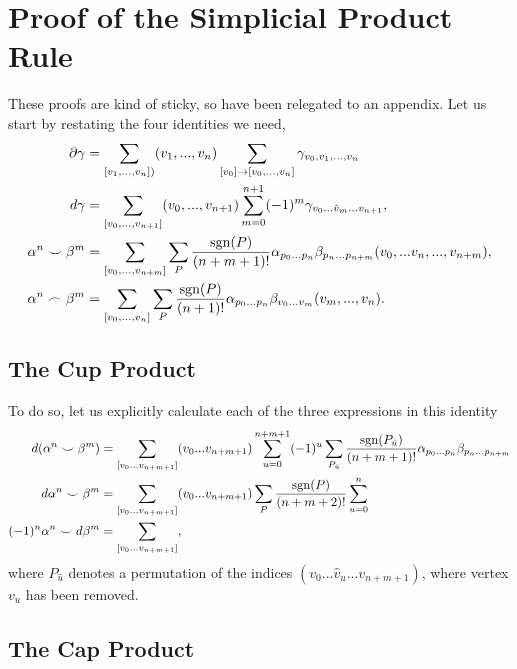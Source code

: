 \appendix
\section{Proof of the Simplicial Product Rule} \label{apx:chain_proof}

These proofs are kind of sticky, so have been relegated to an appendix.
Let us start by restating the four identities we need,
\begin{align}
    \partial \gamma &=\sum_{[v_1, ... ,v_{n}])} (v_1, ... ,v_{n}) 
    \sum_{[v_0]\rightarrow [v_0, ... ,v_{n}]}
    \gamma_{v_0, v_1, ... ,v_{n}}
    \\
    d\gamma
    &= \sum_{[v_0, ... , v_{n+1}]}
    (v_0, ... , v_{n+1})
    \sum_{m = 0}^{n+1}(-1)^m
    \gamma_{v_0...\hat v_m...v_{n+1}},
    \\
    \alpha^n \smile \beta^m &= \sum_{[v_0, ...,v_{n+m}]} 
    \sum_{P} \frac{\textup{sgn}(P)}{(n+m+1)!} \alpha_{p_0 ...p_n}\beta_{p_n ...p_{n+m}} (v_0, ...v_n,...,v_{n+m}),
    \\
    \alpha^n \frown \beta^m &= \sum_{[v_0, ...,v_{n}]} 
    \sum_{P} \frac{\textup{sgn}(P)}{(n+1)!} \alpha_{p_0 ...p_n}\beta_{v_0 ...v_m} (v_m,...,v_{n}).
\end{align}


\subsection{The Cup Product}
To do so, let us explicitly calculate each of the three expressions in this identity
\begin{align}
    d (\alpha^n \smile \beta^m) &=
    \sum_{[v_0...v_{n+m+1}]} 
    (v_0 ... v_{n+m+1})
    \sum_{u = 0}^{n+m+1}(-1)^u
    \sum_{P_{\hat u}} 
    \frac{\textup{sgn}(P_{\hat u})}{(n+m+1)!}
    \alpha_{p_0...p_n} 
    \beta_{p_n...p_{n+m}}
    \\
    d \alpha^n \smile \beta^m &= 
    \sum_{[v_0...v_{n+m+1}]}
    (v_0 ... v_{n+m+1})
    \sum_{P}\frac{\textup{sgn}(P)}{(n+m+2)!}
    \sum_{u = 0}^{n}
    \\
    (-1)^n \alpha^n \smile d\beta^m &= 
    \sum_{[v_0...v_{n+m+1}]},
\end{align}
where $P_{\hat u}$ denotes a permutation of the indices $(v_0 ... \hat v_u ... v_{n+m+1})$, where vertex $v_u$ has been removed.

\subsection{The Cap Product}

